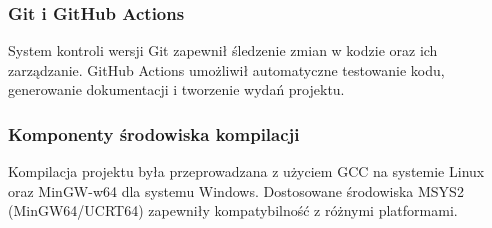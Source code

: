 \subsubsection{Git i GitHub Actions}
System kontroli wersji Git zapewnił śledzenie zmian w kodzie oraz ich zarządzanie. GitHub Actions umożliwił automatyczne testowanie kodu, generowanie dokumentacji i tworzenie wydań projektu.

\subsubsection{Komponenty środowiska kompilacji}
Kompilacja projektu była przeprowadzana z użyciem GCC na systemie Linux oraz MinGW-w64 dla systemu Windows. Dostosowane środowiska MSYS2 (MinGW64/UCRT64) zapewniły kompatybilność z różnymi platformami.
